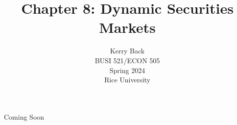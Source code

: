 \documentclass[10pt]{beamer}
\title{Chapter 8: Dynamic Securities Markets}
\date{}
\author{Kerry Back\\ 
BUSI 521/ECON 505\\
Spring 2024\\
Rice University}
\begin{document}
\maketitle

\begin{frame}[plain]
    \Large Coming Soon
\end{frame}
\end{document}
